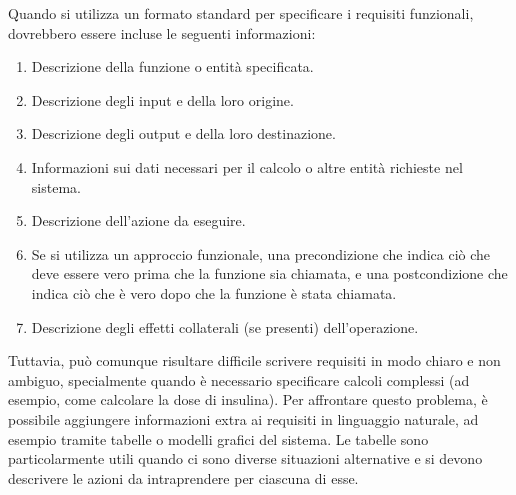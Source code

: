 Quando si utilizza un formato standard per specificare i requisiti funzionali, dovrebbero essere incluse le seguenti informazioni:
\begin{enumerate}
    \item Descrizione della funzione o entità specificata.
    \item Descrizione degli input e della loro origine.
    \item Descrizione degli output e della loro destinazione.
    \item Informazioni sui dati necessari per il calcolo o altre entità richieste nel sistema.
    \item Descrizione dell'azione da eseguire.
    \item Se si utilizza un approccio funzionale, una precondizione che indica ciò che deve essere vero prima che la funzione sia chiamata, e una postcondizione che indica ciò che è vero dopo che la funzione è stata chiamata.
    \item Descrizione degli effetti collaterali (se presenti) dell'operazione.
\end{enumerate}
Tuttavia, può comunque risultare difficile scrivere requisiti in modo chiaro e non ambiguo, specialmente quando è necessario specificare calcoli complessi (ad esempio, come calcolare la dose di insulina). Per affrontare questo problema, è possibile aggiungere informazioni extra ai requisiti in linguaggio naturale, ad esempio tramite tabelle o modelli grafici del sistema. Le tabelle sono particolarmente utili quando ci sono diverse situazioni alternative e si devono descrivere le azioni da intraprendere per ciascuna di esse. 

